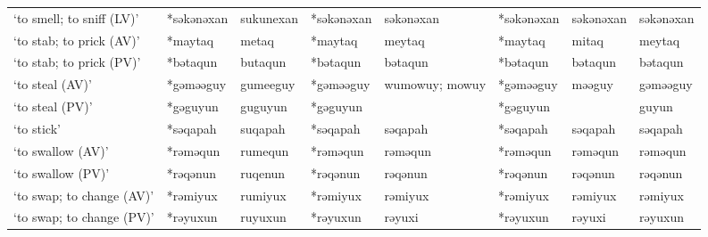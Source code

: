 \begin{landscape}
\begin{longtable}[c]{@{}p{3cm}<{\raggedright}p{2.75cm}<{\raggedright}p{2.75cm}<{\raggedright}p{2.75cm}<{\raggedright}p{2.75cm}<{\raggedright}p{2.75cm}<{\raggedright}p{2.75cm}<{\raggedright}p{2.75cm}<{\raggedright}@{}}
`to smell; to sniff (LV)'                            & *səkənəxan         & sukunexan                      & *səkənəxan         & səkənəxan                  & *səkənəxan       & səkənəxan                & səkənəxan                         \\
`to stab; to prick (AV)'                             & *maytaq            & metaq                          & *maytaq            & meytaq                     & *maytaq          & mitaq                    & meytaq                            \\
`to stab; to prick (PV)'                             & *bətaqun           & butaqun                        & *bətaqun           & bətaqun                    & *bətaqun         & bətaqun                  & bətaqun                           \\
`to steal (AV)'                                      & *gəməəguy          & gumeeguy                       & *gəməəguy          & wumowuy; mowuy             & *gəməəguy        & məəguy                   & gəməəguy                          \\
`to steal (PV)'                                      & *gəguyun           & guguyun                        & *gəguyun           &                            & *gəguyun         &                          & guyun                             \\
`to stick'                                           & *səqapah           & suqapah                        & *səqapah           & səqapah                    & *səqapah         & səqapah                  & səqapah                           \\
`to swallow (AV)'                                    & *rəməqun           & rumequn                        & *rəməqun           & rəməqun                    & *rəməqun         & rəməqun                  & rəməqun                           \\
`to swallow (PV)'                                    & *rəqənun           & ruqenun                        & *rəqənun           & rəqənun                    & *rəqənun         & rəqənun                  & rəqənun                           \\
`to swap; to change (AV)'                            & *rəmiyux           & rumiyux                        & *rəmiyux           & rəmiyux                    & *rəmiyux         & rəmiyux                  & rəmiyux                           \\
`to swap; to change (PV)'                            & *rəyuxun           & ruyuxun                        & *rəyuxun           & rəyuxi                     & *rəyuxun         & rəyuxi                   & rəyuxun                           \\

\end{longtable}
\end{landscape}
